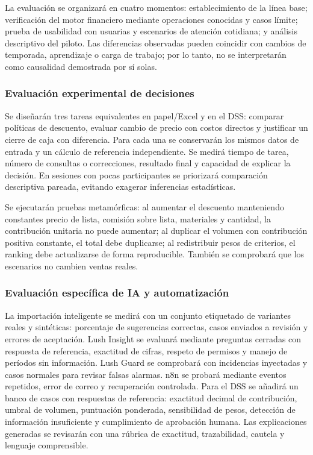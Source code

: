 La evaluación se organizará en cuatro momentos: establecimiento de la línea base; verificación del motor financiero mediante operaciones conocidas y casos límite; prueba de usabilidad con usuarias y escenarios de atención cotidiana; y análisis descriptivo del piloto. Las diferencias observadas pueden coincidir con cambios de temporada, aprendizaje o carga de trabajo; por lo tanto, no se interpretarán como causalidad demostrada por sí solas.


\subsubsection{Evaluación experimental de decisiones}

Se diseñarán tres tareas equivalentes en papel/Excel y en el DSS: comparar políticas de descuento, evaluar cambio de precio con costos directos y justificar un cierre de caja con diferencia. Para cada una se conservarán los mismos datos de entrada y un cálculo de referencia independiente. Se medirá tiempo de tarea, número de consultas o correcciones, resultado final y capacidad de explicar la decisión. En sesiones con pocas participantes se priorizará comparación descriptiva pareada, evitando exagerar inferencias estadísticas.


Se ejecutarán pruebas metamórficas: al aumentar el descuento manteniendo constantes precio de lista, comisión sobre lista, materiales y cantidad, la contribución unitaria no puede aumentar; al duplicar el volumen con contribución positiva constante, el total debe duplicarse; al redistribuir pesos de criterios, el ranking debe actualizarse de forma reproducible. También se comprobará que los escenarios no cambien ventas reales.


\subsubsection{Evaluación específica de IA y automatización}

La importación inteligente se medirá con un conjunto etiquetado de variantes reales y sintéticas: porcentaje de sugerencias correctas, casos enviados a revisión y errores de aceptación. Lush Insight se evaluará mediante preguntas cerradas con respuesta de referencia, exactitud de cifras, respeto de permisos y manejo de períodos sin información. Lush Guard se comprobará con incidencias inyectadas y casos normales para revisar falsas alarmas. n8n se probará mediante eventos repetidos, error de correo y recuperación controlada. Para el DSS se añadirá un banco de casos con respuestas de referencia: exactitud decimal de contribución, umbral de volumen, puntuación ponderada, sensibilidad de pesos, detección de información insuficiente y cumplimiento de aprobación humana. Las explicaciones generadas se revisarán con una rúbrica de exactitud, trazabilidad, cautela y lenguaje comprensible.


